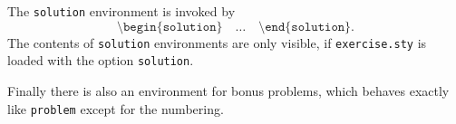 \documentclass[a4paper]{layout}
\begin{document}
\begin{solution}
  The \texttt{solution} environment is invoked by
  \[
    \texttt{\textbackslash begin\{solution\}}
    \quad \unicodeellipsis \quad
    \texttt{\textbackslash end\{solution\}}.
  \]
  The contents of \texttt{solution} environments are only visible,
  if \texttt{exercise.sty} is loaded with the option \texttt{solution}.
\end{solution}

\begin{bonusproblem}[3]
  Finally there is also an environment for bonus problems,
  which behaves exactly like \texttt{problem} except for the numbering.
\end{bonusproblem}
\end{document}
